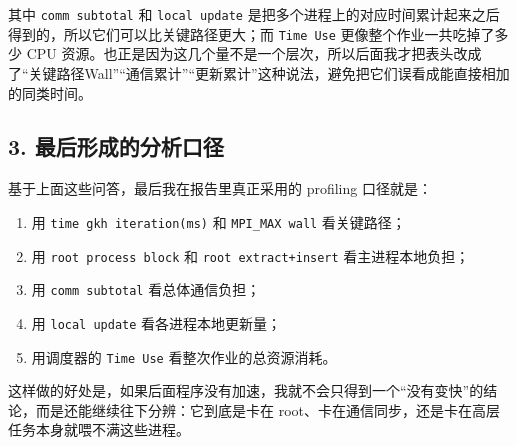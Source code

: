 \documentclass[12pt,a4paper,fontset=none]{ctexart}
\begin{document}
其中 \texttt{comm subtotal} 和 \texttt{local update} 是把多个进程上的对应时间累计起来之后得到的，所以它们可以比关键路径更大；而 \texttt{Time Use} 更像整个作业一共吃掉了多少 CPU 资源。也正是因为这几个量不是一个层次，所以后面我才把表头改成了“关键路径Wall”“通信累计”“更新累计”这种说法，避免把它们误看成能直接相加的同类时间。

\subsection{3. 最后形成的分析口径}

基于上面这些问答，最后我在报告里真正采用的 profiling 口径就是：
\begin{enumerate}
    \item 用 \texttt{time gkh iteration(ms)} 和 \texttt{MPI\_MAX wall} 看关键路径；
    \item 用 \texttt{root process block} 和 \texttt{root extract+insert} 看主进程本地负担；
    \item 用 \texttt{comm subtotal} 看总体通信负担；
    \item 用 \texttt{local update} 看各进程本地更新量；
    \item 用调度器的 \texttt{Time Use} 看整次作业的总资源消耗。
\end{enumerate}

这样做的好处是，如果后面程序没有加速，我就不会只得到一个“没有变快”的结论，而是还能继续往下分辨：它到底是卡在 root、卡在通信同步，还是卡在高层任务本身就喂不满这些进程。
\end{document}
